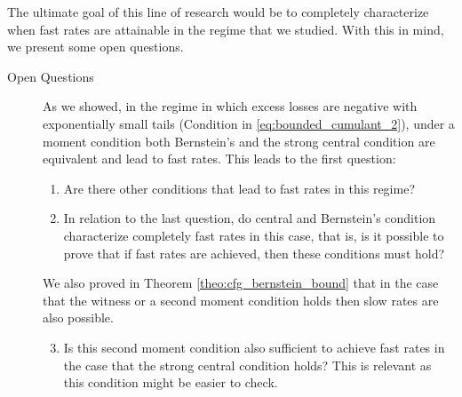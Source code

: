 \documentclass{uvamath}
\theoremstyle{remark}
\theoremstyle{definition}
\theoremstyle{definition}
\theoremstyle{definition}
\theoremstyle{definition}
\theoremstyle{definition}
\begin{document}
The ultimate goal of this line of research would be to completely
characterize when fast rates are attainable in the regime that we
studied. With this in mind, we present some open questions.
\begin{description}
\item[Open Questions] As we showed, in the regime in which excess
  losses are negative with exponentially small tails (Condition in
  \eqref{eq:bounded_cumulant_2}), under a moment condition both
  Bernstein's and the strong central condition are equivalent and lead
  to fast rates. This leads to the first question:
  \begin{enumerate}
  \item Are there other conditions that lead to fast rates in this
    regime?
  \item In relation to the last question, do central and Bernstein's
    condition characterize completely fast rates in this case, that
    is, is it possible to prove that if fast rates are achieved, then
    these conditions must hold?
  \end{enumerate}
  We also proved in Theorem \ref{theo:cfg_bernstein_bound} that in the
  case that the witness or a second moment condition holds then slow
  rates are also possible.
  \begin{enumerate}
    \setcounter{enumi}{2}
  \item Is this second moment condition also sufficient to achieve
    fast rates in the case that the strong central condition holds?
    This is relevant as this condition might be easier to check.
  \end{enumerate}
\end{description}

\end{document}

